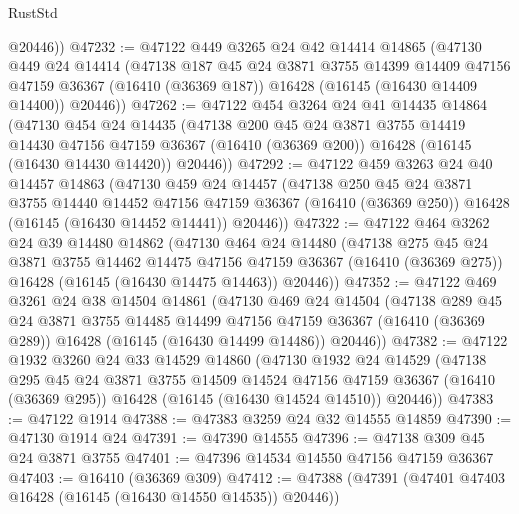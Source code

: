 \begin{lexlean}{RustStd}
\begin{coremodule}
        @20446))
@47232 := @47122
    @449
    @3265
    @24
    @42
    @14414
    @14865
    (@47130
      @449
      @24
      @14414
      (@47138
        @187
        @45
        @24
        @3871
        @3755
        @14399
        @14409
        @47156
        @47159
        @36367
        (@16410 (@36369 @187))
        @16428
        (@16145 (@16430 @14409 @14400))
        @20446))
@47262 := @47122
    @454
    @3264
    @24
    @41
    @14435
    @14864
    (@47130
      @454
      @24
      @14435
      (@47138
        @200
        @45
        @24
        @3871
        @3755
        @14419
        @14430
        @47156
        @47159
        @36367
        (@16410 (@36369 @200))
        @16428
        (@16145 (@16430 @14430 @14420))
        @20446))
@47292 := @47122
    @459
    @3263
    @24
    @40
    @14457
    @14863
    (@47130
      @459
      @24
      @14457
      (@47138
        @250
        @45
        @24
        @3871
        @3755
        @14440
        @14452
        @47156
        @47159
        @36367
        (@16410 (@36369 @250))
        @16428
        (@16145 (@16430 @14452 @14441))
        @20446))
@47322 := @47122
    @464
    @3262
    @24
    @39
    @14480
    @14862
    (@47130
      @464
      @24
      @14480
      (@47138
        @275
        @45
        @24
        @3871
        @3755
        @14462
        @14475
        @47156
        @47159
        @36367
        (@16410 (@36369 @275))
        @16428
        (@16145 (@16430 @14475 @14463))
        @20446))
@47352 := @47122
    @469
    @3261
    @24
    @38
    @14504
    @14861
    (@47130
      @469
      @24
      @14504
      (@47138
        @289
        @45
        @24
        @3871
        @3755
        @14485
        @14499
        @47156
        @47159
        @36367
        (@16410 (@36369 @289))
        @16428
        (@16145 (@16430 @14499 @14486))
        @20446))
@47382 := @47122
    @1932
    @3260
    @24
    @33
    @14529
    @14860
    (@47130
      @1932
      @24
      @14529
      (@47138
        @295
        @45
        @24
        @3871
        @3755
        @14509
        @14524
        @47156
        @47159
        @36367
        (@16410 (@36369 @295))
        @16428
        (@16145 (@16430 @14524 @14510))
        @20446))
@47383 := @47122 @1914
@47388 := @47383 @3259 @24 @32 @14555 @14859
@47390 := @47130 @1914 @24
@47391 := @47390 @14555
@47396 := @47138 @309 @45 @24 @3871 @3755
@47401 := @47396 @14534 @14550 @47156 @47159 @36367
@47403 := @16410 (@36369 @309)
@47412 := @47388 (@47391 (@47401 @47403 @16428 (@16145 (@16430 @14550 @14535)) @20446))

\end{coremodule}
\end{lexlean}
